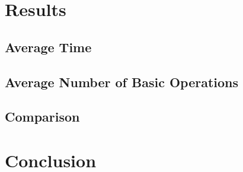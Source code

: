 \documentclass[12pt]{article}
\begin{document}
\section{Results}

\subsection{Average Time}

\subsection{Average Number of Basic Operations}

\subsection{Comparison}

\section{Conclusion}


%

\newpage
\end{document}
